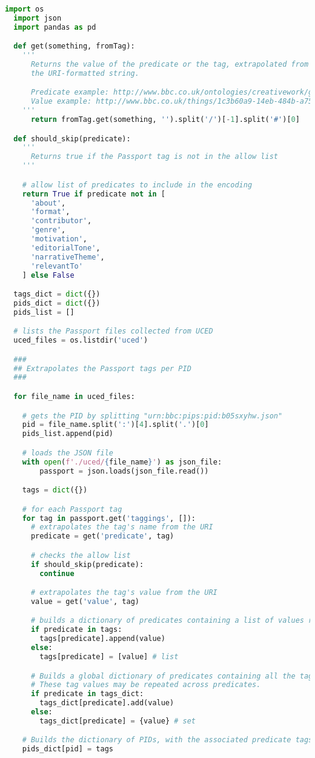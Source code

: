 \begin{lstlisting}[language=Python, caption=Passport tags loading and generation of the PID-tags dictionary]
  import os
  import json
  import pandas as pd

  def get(something, fromTag):
    '''
      Returns the value of the predicate or the tag, extrapolated from
      the URI-formatted string.

      Predicate example: http://www.bbc.co.uk/ontologies/creativework/genre
      Value example: http://www.bbc.co.uk/things/1c3b60a9-14eb-484b-a750-9f5b1aeaac31#id
    '''
      return fromTag.get(something, '').split('/')[-1].split('#')[0]

  def should_skip(predicate):
    '''
      Returns true if the Passport tag is not in the allow list
    '''

    # allow list of predicates to include in the encoding
    return True if predicate not in [
      'about',
      'format',
      'contributor',
      'genre',
      'motivation',
      'editorialTone',
      'narrativeTheme',
      'relevantTo'
    ] else False

  tags_dict = dict({})
  pids_dict = dict({})
  pids_list = []

  # lists the Passport files collected from UCED
  uced_files = os.listdir('uced')

  ###
  ## Extrapolates the Passport tags per PID
  ###

  for file_name in uced_files:

    # gets the PID by splitting "urn:bbc:pips:pid:b05sxyhw.json"
    pid = file_name.split(':')[4].split('.')[0]
    pids_list.append(pid)

    # loads the JSON file
    with open(f'./uced/{file_name}') as json_file:
        passport = json.loads(json_file.read())

    tags = dict({})

    # for each Passport tag
    for tag in passport.get('taggings', []):
      # extrapolates the tag's name from the URI
      predicate = get('predicate', tag)

      # checks the allow list
      if should_skip(predicate):
        continue

      # extrapolates the tag's value from the URI
      value = get('value', tag)

      # builds a dictionary of predicates containing a list of values related to the current PID
      if predicate in tags:
        tags[predicate].append(value)
      else:
        tags[predicate] = [value] # list

      # Builds a global dictionary of predicates containing all the tag values used for all PIDs.
      # These tag values may be repeated across predicates.
      if predicate in tags_dict:
        tags_dict[predicate].add(value)
      else:
        tags_dict[predicate] = {value} # set

    # Builds the dictionary of PIDs, with the associated predicate tags
    pids_dict[pid] = tags
\end{lstlisting}

